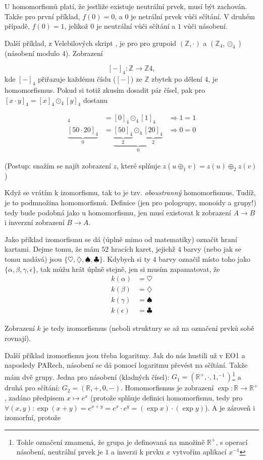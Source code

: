 \documentclass{article}
\begin{document}
U homomorfismů platí, že jestliže existuje neutrální prvek, musí být zachován. Takže pro první příklad, $f(0) = 0$, a $0$ je netrální prvek vůči sčítání. V druhém případě, $f(0) = 1$, jelikož $0$ je neutrální vůči sčítání a $1$ vůči násobení.

Další příklad, z Velebilových skript \cite{velebil07}, je pro pro grupoid $(\mathbb{Z}, \cdot)$ a $(\mathbb{Z}_4, \odot_4)$ (násobení modulo 4). Zobrazení 

$$[-]_4 : \mathbb{Z} \rightarrow \mathbb{Z}4,$$
kde $[-]_4$ přiřazuje každému číslu ($[-]$) ze $\mathbb{Z}$ zbytek po dělení $4$, je homomorfismus. Pokud si totiž zkusím dosadit pár čísel, pak pro $[x \cdot y]_4 = [x]_4 \odot_4 [y]_4$ dostanu

\begin{align*}
[0 \cdot 1]_4 & = [0]_4 \odot_4 [1]_4 & \Rightarrow 1 = 1 \\
\underbrace{[50 \cdot 20]_4}_{0} & = \underbrace{\underbrace{[50]_4}_{2} \odot_4 \underbrace{[20]_4}_{2}}_{0} & \Rightarrow  0  = 0
\end{align*}

(Postup: snažím se najít zobrazení $z$, které splňuje $z(u \oplus_1 v) = z(u) \oplus_2 z(v)$)

Když se vrátím k izomorfismu, tak to je tzv. \textit{oboustranný} homomorfismus. Tudíž, je to podmnožina homomorfismů. Definice (jen pro pologrupy, monoidy a grupy!) tedy bude podobná jako u homomorfismu, jen musí existovat k zobrazení $A \rightarrow B$ i inverzní zobrazení $B \rightarrow A$.

Jako příklad izomorfismu se dá (úplně mimo od matematiky) označit hraní kartami. Dejme tomu, že mám $52$ hracích karet, jejichž $4$ barvy (nebo jak se tomu nadává) jsou $\{\heartsuit, \diamondsuit, \spadesuit, \clubsuit\}$. Kdybych si ty $4$ barvy označil místo toho jako $\{\alpha, \beta, \gamma, \epsilon \}$, tak můžu hrát úplně stejně, jen si musím zapamatovat, že 
\begin{align*}
k(\alpha) &= \heartsuit \\
k(\beta) &= \diamondsuit \\
k(\gamma) &= \spadesuit \\
k(\epsilon) &= \clubsuit
\end{align*}

Zobrazení $k$ je tedy izomorfismus (neboli struktury se až na označení prvků sobě rovnají).

Další příklad izomorfismu jsou třeba logaritmy. Jak do nás hustili už v EO1 a naposledy PARech, násobení se dá pomocí logaritmu převést na sčítání. Takže mám dvě grupy. Jedna pro násobení (kladných čísel): $G_1 = (\mathbb{R}^+, \cdot , 1, ^{-1})$\footnote{Tohle označení zmamená, že grupa je definovaná na množině $\mathbb{R}^+$, s operací násobení, neutrální prvek je $1$ a inverzi k prvku $x$ vytvořím aplikací $x^{-1}$} a druhá pro sčítání: $G_2 = (\mathbb{R},+, 0,-)$. Homomorfismus je zobrazení $\exp : \mathbb{R} \rightarrow \mathbb{R}^+$, zadáno předpisem $x \mapsto e^x$ (protože splňuje definici homomorfismu, tedy pro $\forall(x, y): \exp(x + y) = e^{x+y} = e^x\cdot e^y = (\exp x) \cdot (\exp y)$). A je zároveň i izomorfní, protože
\end{document}
